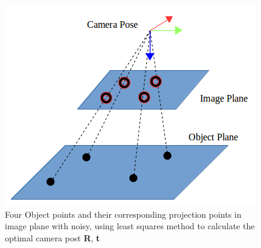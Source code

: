 \begin{figure}[h]
\centering
\includegraphics[scale=0.5]{./fig/least_squares.png}
\caption{Four Object points and their corresponding projection points in image plane with noisy, using least squares method to calculate the optimal camera post \textbf{R}, \textbf{t}}
\label{fig:least_squares}
\end{figure}